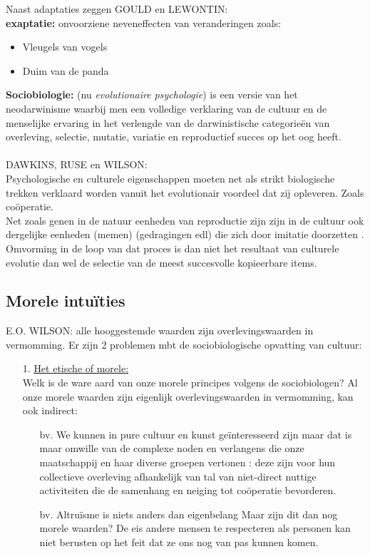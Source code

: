 \documentclass[11pt,a4paper]{article}
\begin{document}
Naast adaptaties zeggen GOULD en LEWONTIN:
\\
\textbf{exaptatie:} onvoorziene neveneffecten van veranderingen zoals:
\begin{itemize}
\item Vleugels van vogels
\item Duim van de panda
\end{itemize}
\textbf{Sociobiologie:} (nu \textit{evolutionaire psychologie}) is een versie van het neodarwinisme waarbij men een volledige verklaring van de cultuur en de menselijke ervaring in het verlengde van de darwinistische categorie\"en van overleving, selectie, mutatie, variatie en reproductief succes op het oog heeft.
\\
\\
DAWKINS, RUSE en WILSON:
\\
Psychologische en culturele eigenschappen moeten net als strikt biologische trekken verklaard worden vanuit het evolutionair voordeel dat zij opleveren. Zoals co\"operatie.
\\
Net zoals genen in de natuur eenheden van reproductie zijn zijn in de cultuur ook dergelijke eenheden (memen) (gedragingen edl) die zich door imitatie doorzetten . Omvorming in de loop van dat proces is dan niet het resultaat van culturele evolutie dan wel de selectie van de meest succesvolle kopieerbare items.

\subsection{Morele intu\"ities}
E.O. WILSON: alle hooggestemde waarden zijn overlevingswaarden in vermomming.
Er zijn 2 problemen mbt de sociobiologische opvatting van cultuur:
\begin{enumerate}
\item[1.] \underline{Het etische of morele:}
\\
Welk is de ware aard van onze morele principes volgens de sociobiologen?
Al onze morele waarden zijn eigenlijk overlevingswaarden in vermomming, kan ook indirect:
\begin{itemize}
\item[bv.] We kunnen in pure cultuur en kunst ge\"interesseerd zijn maar dat is maar omwille van de complexe noden en verlangens die onze maatschappij en haar diverse groepen vertonen : deze zijn voor hun collectieve overleving afhankelijk van tal van niet-direct nuttige activiteiten die de samenhang en neiging tot co\"operatie bevorderen.
\item[bv.] Altru\"isme is niets anders dan eigenbelang
Maar zijn dit dan nog morele waarden? De eis andere mensen te respecteren als personen kan niet berusten op het feit dat ze ons nog van pas kunnen komen.
\end{itemize}

\end{enumerate}
\end{document}
